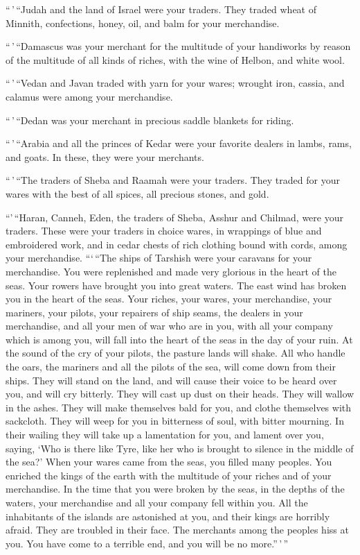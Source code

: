  ``\,'\,``Judah and the land of Israel were your traders.
They traded wheat of Minnith, confections, honey, oil, and balm for your
merchandise.

 ``\,'\,``Damascus was your merchant for the multitude of
your handiworks by reason of the multitude of all kinds of riches, with
the wine of Helbon, and white wool.

 ``\,'\,``Vedan and Javan traded with yarn for your
wares; wrought iron, cassia, and calamus were among your merchandise.

 ``\,'\,``Dedan was your merchant in precious saddle
blankets for riding.

 ``\,'\,``Arabia and all the princes of Kedar were your
favorite dealers in lambs, rams, and goats. In these, they were your
merchants.

 ``\,'\,``The traders of Sheba and Raamah were your
traders. They traded for your wares with the best of all spices, all
precious stones, and gold.

 ``'\,``Haran, Canneh, Eden, the traders of Sheba, Asshur
and Chilmad, were your traders.  These were your traders
in choice wares, in wrappings of blue and embroidered work, and in cedar
chests of rich clothing bound with cords, among your merchandise.
 ```\,``The ships of Tarshish were your caravans for your
merchandise. You were replenished and made very glorious in the heart of
the seas.  Your rowers have brought you into great
waters. The east wind has broken you in the heart of the seas.
 Your riches, your wares, your merchandise, your
mariners, your pilots, your repairers of ship seams, the dealers in your
merchandise, and all your men of war who are in you, with all your
company which is among you, will fall into the heart of the seas in the
day of your ruin.  At the sound of the cry of your
pilots, the pasture lands will shake.  All who handle the
oars, the mariners and all the pilots of the sea, will come down from
their ships. They will stand on the land,  and will cause
their voice to be heard over you, and will cry bitterly. They will cast
up dust on their heads. They will wallow in the ashes. 
They will make themselves bald for you, and clothe themselves with
sackcloth. They will weep for you in bitterness of soul, with bitter
mourning.  In their wailing they will take up a
lamentation for you, and lament over you, saying, `Who is there like
Tyre, like her who is brought to silence in the middle of the sea?'
 When your wares came from the seas, you filled many
peoples. You enriched the kings of the earth with the multitude of your
riches and of your merchandise.  In the time that you
were broken by the seas, in the depths of the waters, your merchandise
and all your company fell within you.  All the
inhabitants of the islands are astonished at you, and their kings are
horribly afraid. They are troubled in their face.  The
merchants among the peoples hiss at you. You have come to a terrible
end, and you will be no more.''\,'\,''

